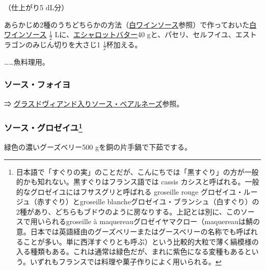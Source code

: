 \begin{recette}
（仕上がり5 dL分）

あらかじめ2種のうちどちらかの方法（\protect\hyperlink{sauce-vin-blanc}{白ワインソース}参照）で作っておいた\protect\hyperlink{sauce-vin-blanc}{白ワインソース}
\(\frac{1}{2}\)
Lに、\protect\hyperlink{beurre-d-echalote}{エシャロットバター}40
gと、パセリ、セルフイユ、エストラゴンのみじん切りを大さじ1
\(\frac{1}{2}\)杯加える。

\ldots{}\ldots{}魚料理用。

\hypertarget{sauce-foyot}{%
\subsubsection{ソース・フォイヨ}\label{sauce-foyot}}


⇒
\protect\hyperlink{sauce-bearnaise-a-la-glace-de-viande}{グラスドヴィアンド入りソース・ベアルネーズ}参照。

\hypertarget{sauce-groseilles}{%
\subsubsection[ソース・グロゼイユ]{\texorpdfstring{ソース・グロゼイユ\footnote{日本語で「すぐりの実」のことだが、こんにちでは「黒すぐり」の方が一般的かも知れない。黒すぐりはフランス語では
  cassis カシスと呼ばれる。一般的なグロゼイユにはフサスグリと呼ばれる
  groseille rouge グロゼイユ・ルージュ（赤すぐり）とgroseille
  blancheグロゼイユ・ブランシュ（白すぐり）の2種があり、どちらもブドウのように房なりする。上記とは別に、このソースで用いられるgroseille
  à
  maquereauグロゼイヤマクロー（maquereauは鯖の意。日本では英語経由のグーズベリーまたはグースベリーの名称でも呼ばれることが多い。単に西洋すぐりとも呼ぶ）という比較的大粒で薄く縞模様の入る種類もある。これは通常は緑色だが、まれに紫色になる変種もあるという。いずれもフランスでは料理や菓子作りによく用いられる。}}{ソース・グロゼイユ}}\label{sauce-groseilles}}



緑色の濃いグーズベリー500 gを銅の片手鍋で下茹でする。


\end{recette}
